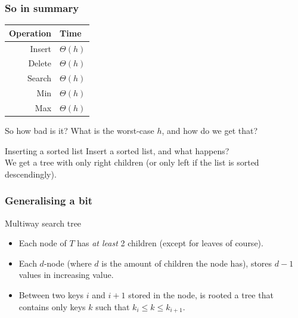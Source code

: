 \begin{frame}
	\frametitle{So in summary}
	\begin{tabular}{r | l}
		Operation & Time \\
		\midrule
		Insert & $\Theta(h)$ \\
		Delete & $\Theta(h)$ \\
		Search & $\Theta(h)$ \\
		Min & $\Theta(h)$ \\
		Max & $\Theta(h)$ \\
	\end{tabular}
	\pause	
	\begin{block}{So how bad is it?}
		What is the worst-case $h$, and how do we get that?
	\end{block}
	\pause
	\begin{block}{Inserting a sorted list}
		Insert a sorted list, and what happens? \\
		\pause 
		We get a tree with only right children (or only left if the list is sorted descendingly).
	\end{block}
	
\end{frame}


\begin{frame}
	\frametitle{Generalising a bit}
		\begin{block}{Multiway search tree}
			\begin{itemize}
				\item Each node of $T$ has \textit{at least} 2 children (except for leaves of course).
				\item Each $d$-node (where $d$ is the amount of children the node has), stores $d-1$ values in increasing value.
				\item Between two keys $i$ and $i+1$ stored in the node, is rooted a tree that contains only keys $k$ such that
					$k_i \leq k \leq k_{i+1}$.
			\end{itemize}
			
		\end{block}	

	
\end{frame}

